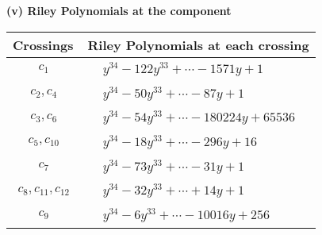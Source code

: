 \documentclass[1p]{elsarticle_modified}
\theoremstyle{definition}
\begin{document}
\flushleft \textbf{(v) Riley Polynomials at the component}\newline \\
\begin{tabular}{m{50pt}|m{274pt}}
Crossings & \hspace{64pt}Riley Polynomials at each crossing \\
\hline $$\begin{aligned}c_{1}\end{aligned}$$&$\begin{aligned}
&y^{34}-122 y^{33}+\cdots-1571 y+1
\end{aligned}$\\
\hline $$\begin{aligned}c_{2},c_{4}\end{aligned}$$&$\begin{aligned}
&y^{34}-50 y^{33}+\cdots-87 y+1
\end{aligned}$\\
\hline $$\begin{aligned}c_{3},c_{6}\end{aligned}$$&$\begin{aligned}
&y^{34}-54 y^{33}+\cdots-180224 y+65536
\end{aligned}$\\
\hline $$\begin{aligned}c_{5},c_{10}\end{aligned}$$&$\begin{aligned}
&y^{34}-18 y^{33}+\cdots-296 y+16
\end{aligned}$\\
\hline $$\begin{aligned}c_{7}\end{aligned}$$&$\begin{aligned}
&y^{34}-73 y^{33}+\cdots-31 y+1
\end{aligned}$\\
\hline $$\begin{aligned}c_{8},c_{11},c_{12}\end{aligned}$$&$\begin{aligned}
&y^{34}-32 y^{33}+\cdots+14 y+1
\end{aligned}$\\
\hline $$\begin{aligned}c_{9}\end{aligned}$$&$\begin{aligned}
&y^{34}-6 y^{33}+\cdots-10016 y+256
\end{aligned}$\\
\hline
\end{tabular}\\~\\
\end{document}
